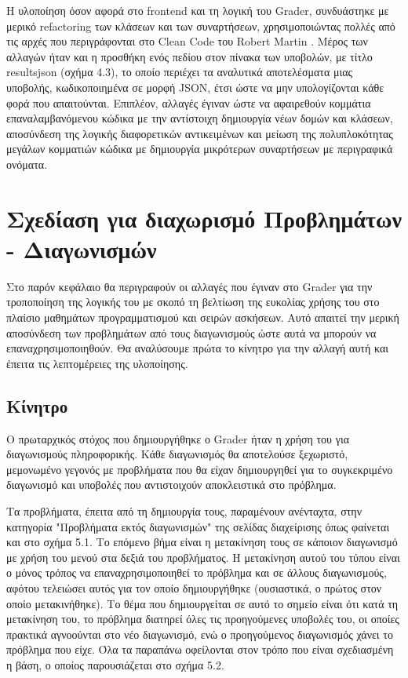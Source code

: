 \documentclass[diploma]{softlab-thesis}
\begin{document}
\bigskip

Η υλοποίηση όσον αφορά στο frontend και τη λογική του Grader, συνδυάστηκε με
μερικό refactoring των κλάσεων και των συναρτήσεων, χρησιμοποιώντας πολλές από
τις αρχές που περιγράφονται στο Clean Code του Robert Martin
\cite{martin2009clean}. Μέρος των αλλαγών ήταν και η προσθήκη ενός πεδίου στον
πίνακα των υποβολών, με τίτλο resultsjson (σχήμα 4.3), το οποίο περιέχει τα
αναλυτικά αποτελέσματα μιας υποβολής, κωδικοποιημένα σε μορφή JSON, έτσι ώστε
να μην υπολογίζονται κάθε φορά που απαιτούνται. Επιπλέον, αλλαγές έγιναν ώστε
να αφαιρεθούν κομμάτια επαναλαμβανόμενου κώδικα με την αντίστοιχη δημιουργία
νέων δομών και κλάσεων, αποσύνδεση της λογικής διαφορετικών αντικειμένων και
μείωση της πολυπλοκότητας μεγάλων κομματιών κώδικα με δημιουργία μικρότερων
συναρτήσεων με περιγραφικά ονόματα.


\chapter{Σχεδίαση για διαχωρισμό Προβλημάτων - Διαγωνισμών}

Στο παρόν κεφάλαιο θα περιγραφούν οι αλλαγές που έγιναν στο Grader για την
τροποποίηση της λογικής του με σκοπό τη βελτίωση της ευκολίας χρήσης του
στο πλαίσιο μαθημάτων προγραμματισμού και σειρών ασκήσεων. Αυτό απαιτεί την
μερική αποσύνδεση των προβλημάτων από τους διαγωνισμούς ώστε αυτά να μπορούν
να επαναχρησιμοποιηθούν. Θα αναλύσουμε πρώτα το κίνητρο για την αλλαγή αυτή
και έπειτα τις λεπτομέρειες της υλοποίησης.

\section{Κίνητρο}

Ο πρωταρχικός στόχος που δημιουργήθηκε ο Grader ήταν η χρήση του για διαγωνισμούς
πληροφορικής. Κάθε διαγωνισμός θα αποτελούσε ξεχωριστό, μεμονωμένο γεγονός με
προβλήματα που θα είχαν δημιουργηθεί για το συγκεκριμένο διαγωνισμό και υποβολές
που αντιστοιχούν αποκλειστικά στο πρόβλημα.

\bigskip

Τα προβλήματα, έπειτα από τη δημιουργία τους, παραμένουν ανένταχτα, στην
κατηγορία "Προβλήματα εκτός διαγωνισμών" της σελίδας διαχείρισης όπως φαίνεται
και στο σχήμα 5.1. Το επόμενο βήμα είναι η μετακίνηση τους σε κάποιον
διαγωνισμό με χρήση του μενού στα δεξιά του προβλήματος. Η μετακίνηση αυτού του
τύπου είναι ο μόνος τρόπος να επαναχρησιμοποιηθεί το πρόβλημα και σε άλλους
διαγωνισμούς, αφότου τελειώσει αυτός για τον οποίο δημιουργήθηκε (ουσιαστικά, ο
πρώτος στον οποίο μετακινήθηκε). Το θέμα που δημιουργείται σε αυτό το σημείο
είναι ότι κατά τη μετακίνηση του, το πρόβλημα διατηρεί όλες τις προηγούμενες
υποβολές του, οι οποίες πρακτικά αγνοούνται στο νέο διαγωνισμό, ενώ ο
προηγούμενος διαγωνισμός χάνει το πρόβλημα που είχε. Όλα τα παραπάνω οφείλονται
στον τρόπο που είναι σχεδιασμένη η βάση, ο οποίος παρουσιάζεται στο σχήμα 5.2.
\end{document}
